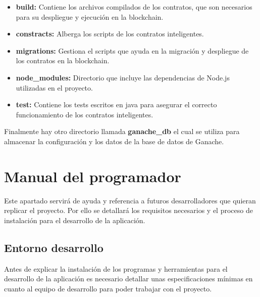 \begin{itemize}

\item \textbf{build:} Contiene los archivos compilados de los contratos, que son necesarios para su despliegue y ejecución en la blockchain.

\item \textbf{constracts:} Alberga los scripts de los contratos inteligentes.

\item \textbf{migrations:} Gestiona el scripts que ayuda en la migración y despliegue de los contratos en la blockchain.

\item \textbf{node\_modules:} Directorio que incluye las dependencias de Node.js utilizadas en el proyecto.

\item \textbf{test:} Contiene los tests escritos en java para asegurar el correcto funcionamiento de los contratos inteligentes.

\end{itemize}

Finalmente hay otro directorio llamada \textbf{ganache\_db} el cual se utiliza para almacenar la configuración y los datos de la base de datos de Ganache.



\section{Manual del programador}

Este apartado servirá de ayuda y referencia a futuros desarrolladores que quieran replicar el proyecto. 
Por ello se detallará los requisitos necesarios y el proceso de instalación para el desarrollo de la aplicación. 

\subsection{Entorno desarrollo}

Antes de explicar la instalación de los programas y herramientas para el desarrollo de la aplicación es necesario detallar unas especificaciones mínimas en cuanto al equipo de desarrollo para poder trabajar con el proyecto.


